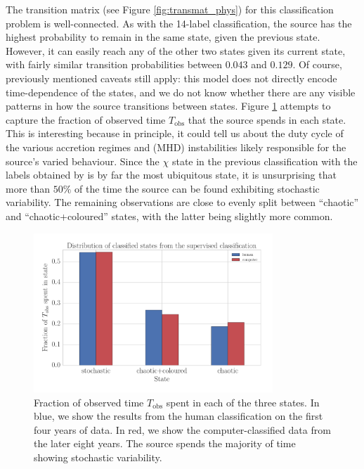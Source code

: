 \documentclass[fleqn,usenatbib]{mnras}
\begin{document}
The transition matrix (see Figure \ref{fig:transmat_phys}) for this classification problem is well-connected. As with the 14-label classification, the source has the 
highest probability to remain in the same state, given the previous state. However, it can easily reach any of the other two states given its current state, with fairly 
similar transition probabilities between $0.043$ and $0.129$. Of course, previously mentioned caveats still apply: this model does not directly encode time-dependence of the states, and we do not know whether there are any visible patterns in how the source transitions between states. Figure \ref{fig:duration_phys} attempts to capture the fraction of observed time $T_\mathrm{obs}$ that the source spends in each state. This is interesting because in principle, it could tell us about the duty cycle of the various accretion regimes and (MHD) instabilities likely responsible for the source's varied behaviour.
Since the $\chi$ state in the previous classification with the labels obtained by \citet{belloni2000} is by far the most ubiquitous state, it is unsurprising that more 
than $50\%$ of the time the source can be found exhibiting stochastic variability. The remaining observations are close to evenly split between ``chaotic'' and 
``chaotic+coloured'' states, with the latter being slightly more common.

\begin{figure}
\begin{center}
\includegraphics[width=9cm]{grs1915_supervised_phys_states_histogram.pdf}
\caption{Fraction of observed time $T_{\mathrm{obs}}$ spent in each of the three states. In blue, we show the results from the human classification on the first four 
years of data. In red, we show the computer-classified data from the later eight years. The source spends the majority of time showing stochastic variability.} 
\label{fig:duration_phys}
\end{center}
\end{figure}
\end{document}
